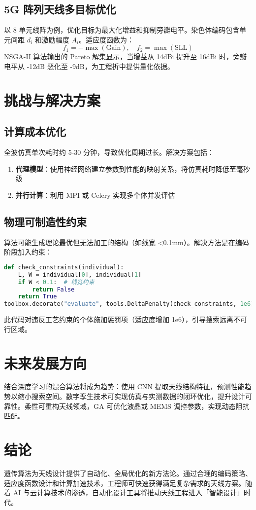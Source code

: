 \section{5G 阵列天线多目标优化}
以 8 单元线阵为例，优化目标为最大化增益和抑制旁瓣电平。染色体编码包含单元间距 $d_i$ 和激励幅度 $A_i$。适应度函数为：
$$ f_1 = -\max(\text{Gain}), \quad f_2 = \max(\text{SLL}) $$
NSGA-II 算法输出的 Pareto 解集显示，当增益从 14dBi 提升至 16dBi 时，旁瓣电平从 -12dB 恶化至 -9dB，为工程折中提供量化依据。\par
\chapter{挑战与解决方案}
\section{计算成本优化}
全波仿真单次耗时约 5-30 分钟，导致优化周期过长。解决方案包括：\par
\begin{enumerate}
\item \textbf{代理模型}：使用神经网络建立参数到性能的映射关系，将仿真耗时降低至毫秒级
\item \textbf{并行计算}：利用 MPI 或 Celery 实现多个体并发评估
\end{enumerate}
\section{物理可制造性约束}
算法可能生成理论最优但无法加工的结构（如线宽 <0.1mm）。解决方法是在编码阶段加入约束：\par
\begin{lstlisting}[language=python]
def check_constraints(individual):
    L, W = individual[0], individual[1]
    if W < 0.1:  # 线宽约束
        return False
    return True
toolbox.decorate("evaluate", tools.DeltaPenalty(check_constraints, 1e6))
\end{lstlisting}
此代码对违反工艺约束的个体施加惩罚项（适应度增加 1e6），引导搜索远离不可行区域。\par
\chapter{未来发展方向}
结合深度学习的混合算法将成为趋势：使用 CNN 提取天线结构特征，预测性能趋势以缩小搜索空间。数字孪生技术可实现仿真与实测数据的闭环优化，提升设计可靠性。柔性可重构天线领域，GA 可优化液晶或 MEMS 调控参数，实现动态阻抗匹配。\par
\chapter{结论}
遗传算法为天线设计提供了自动化、全局优化的新方法论。通过合理的编码策略、适应度函数设计和计算加速技术，工程师可快速获得满足复杂需求的天线方案。随着 AI 与云计算技术的渗透，自动化设计工具将推动天线工程进入「智能设计」时代。\par
